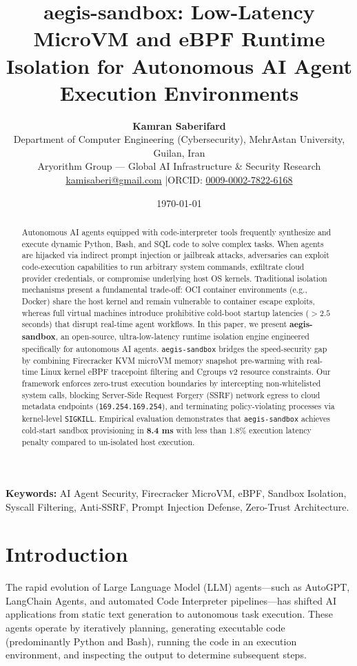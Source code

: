 \documentclass[10pt,twocolumn,a4paper]{article}
\title{\textbf{aegis-sandbox: Low-Latency MicroVM and eBPF Runtime Isolation for Autonomous AI Agent Execution Environments}}
\author{
    \textbf{Kamran Saberifard}\\
    Department of Computer Engineering (Cybersecurity), MehrAstan University, Guilan, Iran\\
    Aryorithm Group — Global AI Infrastructure \& Security Research\\
    \href{mailto:kamisaberi@gmail.com}{kamisaberi@gmail.com} \quad|\quad ORCID: \href{https://orcid.org/0009-0002-7822-6168}{0009-0002-7822-6168}
}
\date{\today}
\begin{document}
\maketitle

\begin{abstract}
Autonomous AI agents equipped with code-interpreter tools frequently synthesize and execute dynamic Python, Bash, and SQL code to solve complex tasks. When agents are hijacked via indirect prompt injection or jailbreak attacks, adversaries can exploit code-execution capabilities to run arbitrary system commands, exfiltrate cloud provider credentials, or compromise underlying host OS kernels. Traditional isolation mechanisms present a fundamental trade-off: OCI container environments (e.g., Docker) share the host kernel and remain vulnerable to container escape exploits, whereas full virtual machines introduce prohibitive cold-boot startup latencies ($>2.5$ seconds) that disrupt real-time agent workflows. In this paper, we present \textbf{aegis-sandbox}, an open-source, ultra-low-latency runtime isolation engine engineered specifically for autonomous AI agents. \texttt{aegis-sandbox} bridges the speed-security gap by combining Firecracker KVM microVM memory snapshot pre-warming with real-time Linux kernel eBPF tracepoint filtering and Cgroups v2 resource constraints. Our framework enforces zero-trust execution boundaries by intercepting non-whitelisted system calls, blocking Server-Side Request Forgery (SSRF) network egress to cloud metadata endpoints (\texttt{169.254.169.254}), and terminating policy-violating processes via kernel-level \texttt{SIGKILL}. Empirical evaluation demonstrates that \texttt{aegis-sandbox} achieves cold-start sandbox provisioning in \textbf{8.4 ms} with less than 1.8\% execution latency penalty compared to un-isolated host execution.
\end{abstract}

\textbf{Keywords:} AI Agent Security, Firecracker MicroVM, eBPF, Sandbox Isolation, Syscall Filtering, Anti-SSRF, Prompt Injection Defense, Zero-Trust Architecture.

\section{Introduction}
The rapid evolution of Large Language Model (LLM) agents—such as AutoGPT, LangChain Agents, and automated Code Interpreter pipelines—has shifted AI applications from static text generation to autonomous task execution. These agents operate by iteratively planning, generating executable code (predominantly Python and Bash), running the code in an execution environment, and inspecting the output to determine subsequent steps.
\end{document}
